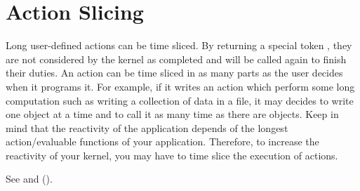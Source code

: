 \section{Action Slicing}

Long user-defined actions can be time sliced. By returning a special token
, they are not considered by the kernel as completed and will be
called again to finish their duties. An action can be time sliced in as many
parts as the user decides when it programs it. For example, if it writes an
action which perform some long computation such as writing a collection of data
in a file, it may decides to write one object at a time and to call it as many
time as there are objects. Keep in mind that the reactivity of the application
depends of the longest action/evaluable functions of your application.
Therefore, to increase the reactivity of your kernel, you may have to time
slice the execution of actions.

See  and  ().


